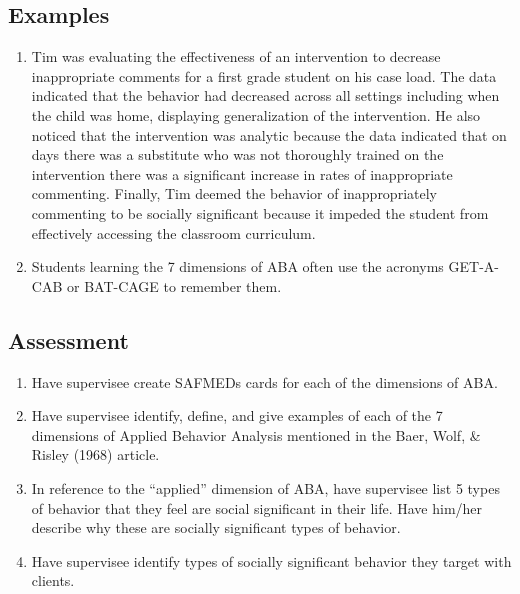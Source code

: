 \subsection{Examples}
\begin{enumerate}
\item Tim was evaluating the effectiveness of an intervention to decrease inappropriate comments for a first grade student on his case load. The data indicated that the behavior had decreased across all settings including when the child was home, displaying generalization of the intervention. He also noticed that the intervention was analytic because the data indicated that on days there was a substitute who was not thoroughly trained on the intervention there was a significant increase in rates of inappropriate commenting. Finally, Tim deemed the behavior of inappropriately commenting to be socially significant because it impeded the student from effectively accessing the classroom curriculum. 
\item Students learning the 7 dimensions of ABA often use the acronyms GET-A-CAB or BAT-CAGE to remember them.
\end{enumerate}
%
\subsection{Assessment}
\begin{enumerate}
\item Have supervisee create SAFMEDs cards for each of the dimensions of ABA.
\item Have supervisee identify, define, and give examples of each of the 7 dimensions of Applied Behavior Analysis mentioned in the Baer, Wolf, \& Risley (1968) article. 
\item In reference to the ``applied'' dimension of ABA, have supervisee list 5 types of behavior that they feel are social significant in their life. Have him/her describe why these are socially significant types of behavior. 
\item Have supervisee identify types of socially significant behavior they target with clients.
\end{enumerate}
%
